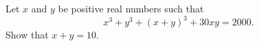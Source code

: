 Let $x$ and $y$ be positive real numbers such that
\[x^3+y^3+(x+y)^3+30xy=2000.\]
Show that $x+y=10$.
